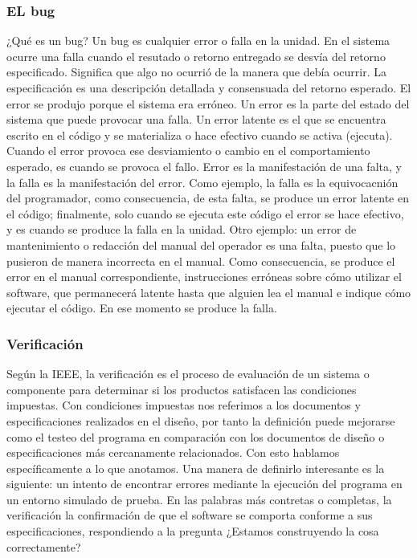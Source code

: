\subsubsection{EL bug} ¿Qué es un bug? Un bug es cualquier error o falla en la unidad. En el sistema ocurre una falla cuando el resutado o retorno entregado se desvía del retorno especificado. Significa que algo no ocurrió de la manera que debía ocurrir. La especificación es una descripción detallada y consensuada del retorno esperado. El error se produjo porque el sistema era erróneo. Un error es la parte del estado del sistema que puede provocar una falla. Un error latente es el que se encuentra escrito en el código y se materializa o hace efectivo cuando se activa (ejecuta). Cuando el error provoca ese desviamiento o cambio en el comportamiento esperado, es cuando se provoca el fallo. Error es la manifestación de una falta, y la falla es la manifestación del error. Como ejemplo, la falla es la equivocacnión del programador, como consecuencia, de esta falta, se produce un error latente en el código; finalmente, solo cuando se ejecuta este código el error se hace efectivo, y es cuando se produce la falla en la unidad. Otro ejemplo: un error de mantenimiento o redacción del manual del operador es una falta, puesto que lo pusieron de manera incorrecta en el manual. Como consecuencia, se produce el error en el manual correspondiente, instrucciones erróneas sobre cómo utilizar el software, que permanecerá latente hasta que alguien lea el manual e indique cómo ejecutar el código. En ese momento se produce la falla.

\subsubsection{Verificación} Según la IEEE, la verificación es el proceso de evaluación de un sistema o componente para determinar si los productos satisfacen las condiciones impuestas. Con condiciones impuestas nos referimos a los documentos y especificaciones realizados en el diseño, por tanto la definición puede mejorarse como el testeo del programa en comparación con los documentos de diseño o especificaciones más cercanamente relacionados. Con esto hablamos específicamente a lo que anotamos. Una manera de definirlo interesante es la siguiente: un intento de encontrar errores mediante la ejecución del programa en un entorno simulado de prueba. En las palabras más contretas o completas, la verificación la confirmación de que el software se comporta conforme a sus especificaciones, respondiendo a la pregunta ¿Estamos construyendo la cosa correctamente?
